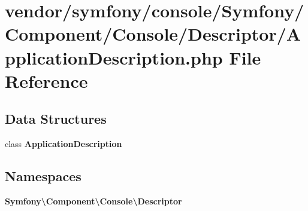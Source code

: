 \section{vendor/symfony/console/\+Symfony/\+Component/\+Console/\+Descriptor/\+Application\+Description.php File Reference}
\label{_application_description_8php}
\subsection*{Data Structures}
\begin{DoxyCompactItemize}
\item 
class {\bf Application\+Description}
\end{DoxyCompactItemize}
\subsection*{Namespaces}
\begin{DoxyCompactItemize}
\item 
 {\bf Symfony\textbackslash{}\+Component\textbackslash{}\+Console\textbackslash{}\+Descriptor}
\end{DoxyCompactItemize}
